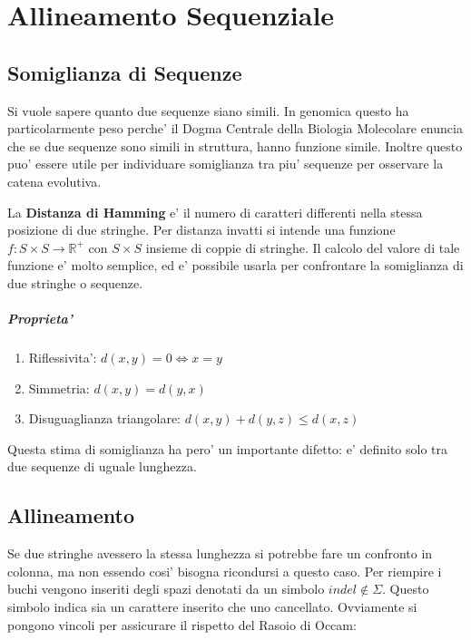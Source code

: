\chapter{Allineamento Sequenziale}

\section{Somiglianza di Sequenze}

Si vuole sapere quanto due sequenze siano simili. In genomica questo ha particolarmente peso perche' il Dogma Centrale della Biologia Molecolare enuncia che se due sequenze sono simili in struttura, hanno funzione simile.
Inoltre questo puo' essere utile per individuare somiglianza tra piu' sequenze per osservare la catena evolutiva.

La \textbf{Distanza di Hamming} e' il numero di caratteri differenti nella stessa posizione di due stringhe.
Per distanza invatti si intende una funzione $f : S \times S \rightarrow \mathbb{R}^+$ con $S \times S$ insieme di coppie di stringhe.
Il calcolo del valore di tale funzione e' molto semplice, ed e' possibile usarla per confrontare la somiglianza di due stringhe o sequenze.

\paragraph{Proprieta'}

\begin{enumerate}
\item Riflessivita': $d(x,y) = 0 \Leftrightarrow x = y$
\item Simmetria: $d(x,y) = d(y,x)$
\item Disuguaglianza triangolare: $d(x,y) + d(y,z) \leq d(x,z)$
\end{enumerate}

Questa stima di somiglianza ha pero' un importante difetto: e' definito solo tra due sequenze di uguale lunghezza.

\section{Allineamento}

Se due stringhe avessero la stessa lunghezza si potrebbe fare un confronto in colonna, ma non essendo cosi' bisogna ricondursi a questo caso.
Per riempire i buchi vengono inseriti degli spazi denotati da un simbolo $indel \notin \Sigma$.
Questo simbolo indica sia un carattere inserito che uno cancellato.
Ovviamente si pongono vincoli per assicurare il rispetto del Rasoio di Occam:

